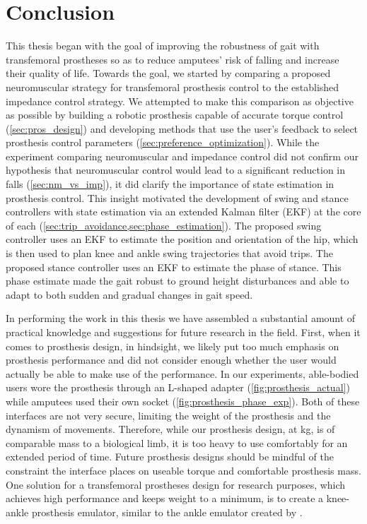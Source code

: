 \chapter{Conclusion}\label{sec:thesis_conclusion}

This thesis began with the goal of improving the robustness of gait with
transfemoral prostheses so as to reduce amputees' risk of falling and increase
their quality of life. Towards the goal, we started by comparing a proposed
neuromuscular strategy for transfemoral prosthesis control to the established
impedance control strategy. We attempted to make this comparison as objective as
possible by building a robotic prosthesis capable of accurate torque control
(\cref{sec:pros_design}) and developing methods that use the user's feedback to
select prosthesis control parameters (\cref{sec:preference_optimization}). While
the experiment comparing neuromuscular and impedance control did not confirm our
hypothesis that neuromuscular control would lead to a significant reduction in
falls (\cref{sec:nm_vs_imp}), it did clarify the importance of state estimation
in prosthesis control. This insight motivated the development of swing and
stance controllers with state estimation via an extended Kalman filter (EKF) at
the core of each (\cref{sec:trip_avoidance,sec:phase_estimation}). The proposed
swing controller uses an EKF to estimate the position and orientation of the
hip, which is then used to plan knee and ankle swing trajectories that avoid
trips. The proposed stance controller uses an EKF to estimate the phase of
stance. This phase estimate made the gait robust to ground height disturbances
and able to adapt to both sudden and gradual changes in gait speed. 

In performing the work in this thesis we have assembled a substantial amount of
practical knowledge and suggestions for future research in the field. First,
when it comes to prosthesis design, in hindsight, we likely put too much
emphasis on prosthesis performance and did not consider enough whether the user
would actually be able to make use of the performance. In our experiments,
able-bodied users wore the prosthesis through an L-shaped adapter
(\cref{fig:prosthesis_actual}) while amputees used their own socket
(\cref{fig:prosthesis_phase_exp}). Both of these interfaces are not very secure,
limiting the weight of the prosthesis and the dynamism of movements. Therefore,
while our prosthesis design, at \unit[6]{kg}, is of comparable mass to a
biological limb, it is too heavy to use comfortably for an extended period of
time. Future prosthesis designs should be mindful of the constraint the
interface places on useable torque and comfortable prosthesis mass. One solution
for a transfemoral prostheses design for research purposes, which achieves high
performance and keeps weight to a minimum, is to create a knee-ankle prosthesis
emulator, similar to the ankle emulator created by
\citet{caputo2013experimental}.


